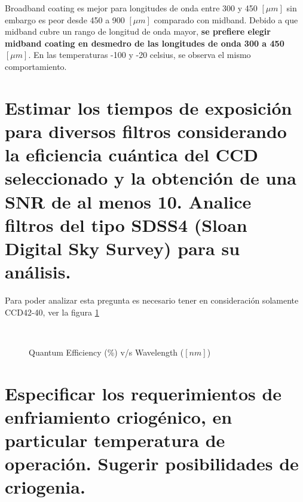 \documentclass[a4paper,10pt]{article}
\begin{document}
Broadband coating es mejor para longitudes de onda entre 300 y 450 $[\mu m]$
sin embargo es peor desde 450 a 900 $[\mu m]$ comparado con midband. Debido a
que midband cubre un rango de longitud de onda mayor, \textbf{se prefiere
elegir  midband coating en desmedro de las longitudes de onda 300 a 450 $[\mu
m]$}. En las temperaturas -100 y -20 celsius,  se observa el mismo comportamiento. 
\section{Estimar los tiempos de exposición para diversos filtros considerando la
eficiencia cuántica del CCD seleccionado y la obtención de una SNR de al menos
10. Analice filtros del tipo SDSS4 (Sloan Digital Sky Survey) para su análisis.}

Para poder analizar esta pregunta es necesario tener en consideración solamente CCD42-40, ver la figura \ref{fig:p4}

\begin{figure}[ht!]
  \centering
  ~ 
  \caption{Quantum Efficiency (\%) v/s Wavelength ($[nm]$)}
  \label{fig:p4}
\end{figure}

\section{Especificar los requerimientos de enfriamiento criogénico, en particular
temperatura de operación. Sugerir posibilidades de criogenia.}
\end{document}
